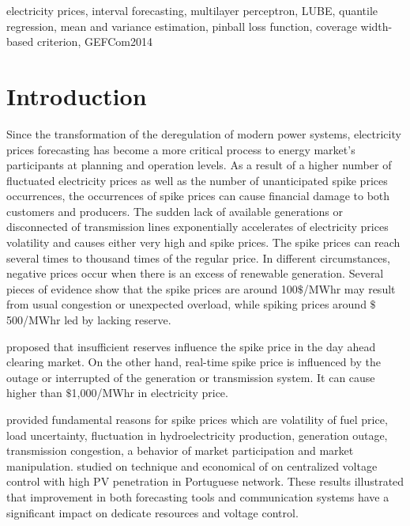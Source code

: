 \documentclass[review]{elsarticle}
\begin{document}
\begin{frontmatter}
    \begin{keyword}
      electricity prices, interval forecasting, multilayer perceptron, LUBE, quantile regression, mean and variance estimation, pinball loss function, coverage width-based criterion, GEFCom2014
    \end{keyword}

  \end{frontmatter}

  \linenumbers

  \section{Introduction}

    Since the transformation of the deregulation of modern power systems, electricity prices forecasting has become a more critical process to energy market's participants at planning and operation levels.
    As a result of a higher number of fluctuated electricity prices as well as the number of unanticipated spike prices occurrences, the occurrences of spike prices can cause financial damage to both customers and producers.
    The sudden lack of available generations or disconnected of transmission lines exponentially accelerates of electricity prices volatility and causes either very high and spike prices.
    The spike prices can reach several times to thousand times of the regular price.
    In different circumstances, negative prices occur when there is an excess of renewable generation.
    Several pieces of evidence show that the spike prices are around 100$\$$/MWhr may result from usual congestion or unexpected overload, while spiking prices around $\$$500/MWhr led by lacking reserve.

    \cite{He2016} proposed that insufficient reserves influence the spike price in the day ahead clearing market.
    On the other hand, real-time spike price is influenced by the outage or interrupted of the generation or transmission system.
    It can cause higher than $\$$1,000/MWhr in electricity price.

    \cite{SINGHAL2011550} provided fundamental reasons for spike prices which are volatility of fuel price, load uncertainty, fluctuation in hydroelectricity production, generation outage, transmission congestion, a behavior of market participation and market manipulation.
    \cite{GONZALEZSOTRES2017338} studied on technique and economical of on centralized voltage control with high PV penetration in Portuguese network.
    These results illustrated that improvement in both forecasting tools and communication systems have a significant impact on dedicate resources and voltage control.
\end{document}

